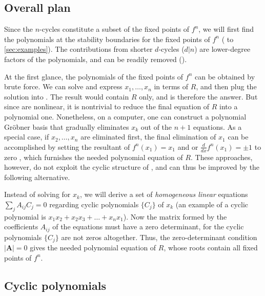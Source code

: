 \documentclass{ws-ijbc}
\begin{document}
\subsection{Overall plan}

Since the $n$-cycles constitute a subset of the fixed points of $f^n$,
we will first find
  the polynomials at the stability boundaries
  for the fixed points of $f^n$
  ( to \ref{sec:examples}).
The contributions from shorter $d$-cycles ($d|n$)
  are lower-degree factors of the polynomials,
  and can be readily removed ().


At the first glance, the polynomials of the fixed points of $f^n$
  can be obtained by brute force.
We can solve
   and express $x_1, \ldots, x_n$
  in terms of $R$,
  and then plug the solution into .
The result would contain $R$ only,
  and is therefore the answer.
But since  are nonlinear,
  it is nontrivial to reduce the final equation of $R$
  into a polynomial one.
Nonetheless, on a computer, one can
  construct a polynomial Gr\"obner basis \cite{kk1}
  that gradually eliminates $x_k$ out of the $n+1$ equations.
As a special case, if $x_2, \dots, x_n$ are eliminated first,
  the final elimination of $x_1$ can be accomplished
  by setting the resultant of $f^n(x_1) = x_1$ and
   or $\frac{d}{dx}f^n (x_1) = \pm 1$
  to zero \cite{burm},
  which furnishes the needed polynomial equation of $R$.
%
These approaches, however, do not
  exploit the cyclic structure of ,
  and can thus be improved by the following alternative.


Instead of solving  for $x_k$,
  we will derive a set of \emph{homogeneous linear} equations
  $\sum_j A_{ij} C_j = 0$
  regarding cyclic polynomials $\{C_j\}$ of $x_k$
  (an example of a cyclic polynomial is $x_1 x_2 + x_2 x_3 + \dots + x_n x_1$).
%
Now the matrix formed by the coefficients $A_{ij}$ of the equations
  must have a zero determinant,
  for the cyclic polynomials $\{C_j\}$ are not zeros altogether.
%
Thus, the zero-determinant condition $|\mathbf A| = 0$ gives
  the needed polynomial equation of $R$,
whose roots contain all fixed points of $f^n$.
%
%


\subsection{\label{sec:cyclic}Cyclic polynomials}
\end{document}
